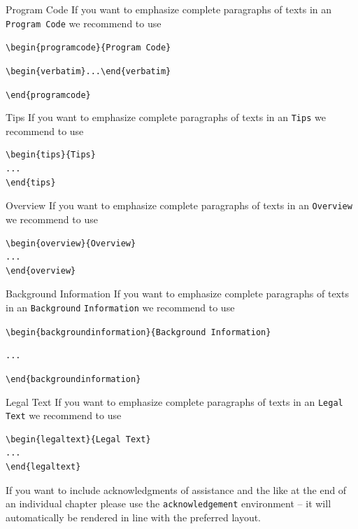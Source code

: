 \documentclass[graybox]{svmult}
\begin{document}
\begin{programcode}{Program Code}
If you want to emphasize complete paragraphs of texts in an \verb|Program Code| we recommend to
use

\verb|\begin{programcode}{Program Code}|

\verb|\begin{verbatim}...\end{verbatim}|

\verb|\end{programcode}|

\end{programcode}
%
\begin{tips}{Tips}
If you want to emphasize complete paragraphs of texts in an \verb|Tips| we recommend to
use  \begin{verbatim}\begin{tips}{Tips}
...
\end{tips}\end{verbatim}
\end{tips}
\eject
%
\begin{overview}{Overview}
If you want to emphasize complete paragraphs of texts in an \verb|Overview| we recommend to
use  \begin{verbatim}\begin{overview}{Overview}
...
\end{overview}\end{verbatim}
\end{overview}
\begin{backgroundinformation}{Background Information}
If you want to emphasize complete paragraphs of texts in an \verb|Background|
\verb|Information| we recommend to
use

\verb|\begin{backgroundinformation}{Background Information}|

\verb|...|

\verb|\end{backgroundinformation}|
\end{backgroundinformation}
\begin{legaltext}{Legal Text}
If you want to emphasize complete paragraphs of texts in an \verb|Legal Text| we recommend to
use  \begin{verbatim}\begin{legaltext}{Legal Text}
...
\end{legaltext}\end{verbatim}
\end{legaltext}
%
\begin{acknowledgement}
If you want to include acknowledgments of assistance and the like at the end of an individual chapter please use the \verb|acknowledgement| environment -- it will automatically be rendered in line with the preferred layout.
\end{acknowledgement}
%
\end{document}
